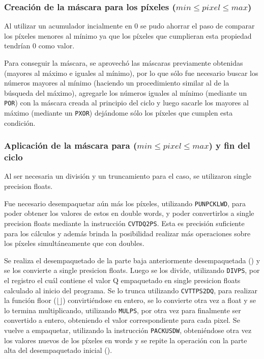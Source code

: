 \subsubsection{Creación de la máscara para los píxeles ($min \leq pixel \leq max$)}
Al utilizar un acumulador incialmente en 0 se pudo ahorrar el paso de comparar los píxeles menores al mínimo ya que los píxeles que cumplieran esta propiedad tendrían 0 como valor.

Para conseguir la máscara, se aprovechó las máscaras previamente obtenidas (mayores al máximo e iguales al mínimo), por lo que sólo fue necesario buscar los números mayores al mínimo (haciendo un procedimiento similar al de la búsqueda del máximo), agregarle los números iguales al mínimo (mediante un \texttt{POR}) con la máscara creada al principio del ciclo y luego sacarle los mayores al máximo (mediante un \texttt{PXOR}) dejándome sólo los píxeles que cumplen esta condición.

\subsubsection{Aplicación de la máscara para ($min \leq pixel \leq max$) y fin del ciclo}
Al ser necesaria un división y un truncamiento para el caso, se utilizaron single precision floats.

Fue necesario desempaquetar aún más los píxeles, utilizando \texttt{PUNPCKLWD}, para poder obtener los valores de estos en double words, y poder convertirlos a single precision floats mediante la instrucción \texttt{CVTDQ2PS}. Esta es precisión suficiente para los cálculos y además brinda la posibilidad realizar más operaciones sobre los píxeles simultáneamente que con doubles.

Se realiza el desempaquetado de la parte baja anteriormente desempaquetada () y se los convierte a single presicion floats. Luego se los divide, utilizando \texttt{DIVPS}, por el registro  el cuál contiene el valor Q empaquetado en single presicion floats calculado al inicio del programa. Se lo trunca utilizando \texttt{CVTTPS2DQ}, para realizar la función floor ($\lfloor \rfloor$) convirtiéndose en entero, se lo convierte otra vez a float y se lo termina multiplicando, utilizando \texttt{MULPS}, por  otra vez para finalmente ser convertido a entero, obteniendo el valor correspondiente para cada pixel. Se vuelve a empaquetar, utilizando la instrucción \texttt{PACKUSDW}, obteniéndose otra vez los valores nuevos de los píxeles en words y se repite la operación con la parte alta del desempaquetado inicial ().

